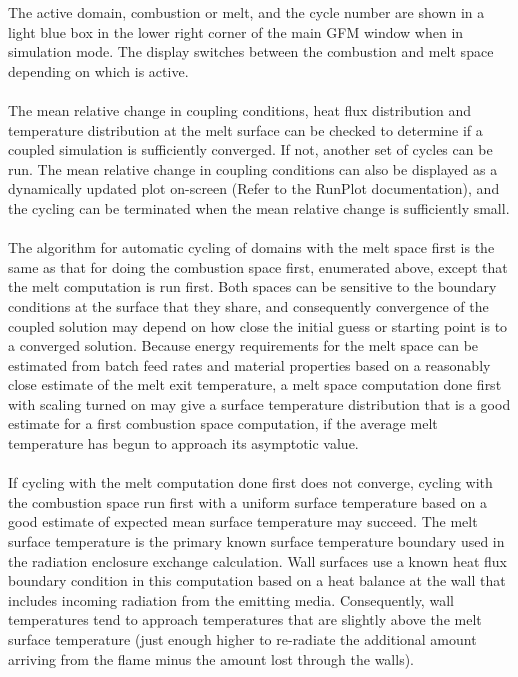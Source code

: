 \documentclass[12pt]{article}
\numberwithin{equation}{section}
\begin{document}
\noindent
The active domain, combustion or melt, and the cycle number are shown in a light blue box in the lower right corner of the main GFM window when in simulation mode. The display switches between the combustion and melt space depending on which is active.\\ 
\\
The mean relative change in coupling conditions, heat flux distribution and temperature distribution at the melt surface can be checked to determine if a coupled simulation is sufficiently converged. If not, another set of cycles can be run. The mean relative change in coupling conditions can also be displayed as a dynamically updated plot on-screen (Refer to the RunPlot documentation), and the cycling can be terminated when the mean relative change is sufficiently small.\\
\\ 
The algorithm for automatic cycling of domains with the melt space first is the same as that for doing the combustion space first, enumerated above, except that the melt computation is run first. Both spaces can be sensitive to the boundary conditions at the surface that they share, and consequently convergence of the coupled solution may depend on how close the initial guess or starting point is to a converged solution. Because energy requirements for the melt space can be estimated from batch feed rates and material properties based on a reasonably close estimate of the melt exit temperature, a melt space computation done first with scaling turned on may give a surface temperature distribution that is a good estimate for a first combustion space computation, if the average melt temperature has begun to approach its asymptotic value.\\
\\
If cycling with the melt computation done first does not converge, cycling with the combustion space run first with a uniform surface temperature based on a good estimate of expected mean surface temperature may succeed. The melt surface temperature is the primary known surface temperature boundary used in the radiation enclosure exchange calculation. Wall surfaces use a known heat flux boundary condition in this computation based on a heat balance at the wall that includes incoming radiation from the emitting media. Consequently, wall temperatures tend to approach temperatures that are slightly above the melt surface temperature (just enough higher to re-radiate the additional amount arriving from the flame minus the amount lost through the walls). 
\end{document}
